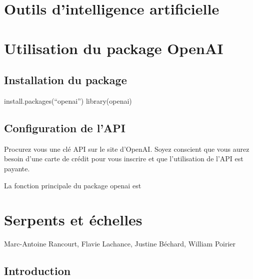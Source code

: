 \documentclass[
  letterpaper,
]{scrbook}
\begin{document}

\hypertarget{outils-dintelligence-artificielle}{%
\chapter{Outils d'intelligence
artificielle}\label{outils-dintelligence-artificielle}}


\hypertarget{utilisation-du-package-openai}{%
\chapter{Utilisation du package
OpenAI}\label{utilisation-du-package-openai}}

\hypertarget{installation-du-package}{%
\section{Installation du package}\label{installation-du-package}}

install.packages(``openai'') library(openai)

\hypertarget{configuration-de-lapi}{%
\section{Configuration de l'API}\label{configuration-de-lapi}}

Procurez vous une clé API sur le site d'OpenAI. Soyez conscient que vous
aurez besoin d'une carte de crédit pour vous inscrire et que
l'utilisation de l'API est payante.

La fonction principale du package openai est


\hypertarget{serpents-et-uxe9chelles}{%
\chapter{Serpents et échelles}\label{serpents-et-uxe9chelles}}

\begin{center}

Marc-Antoine Rancourt, Flavie Lachance, Justine Béchard, William Poirier

\end{center}

\hypertarget{introduction-2}{%
\section{Introduction}\label{introduction-2}}
\end{document}
